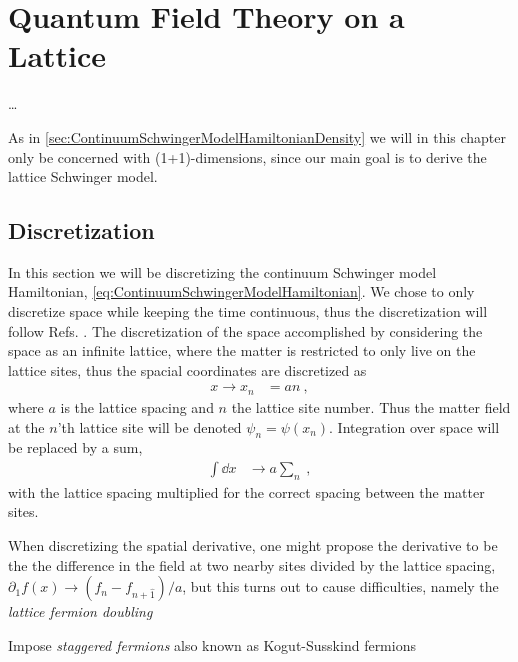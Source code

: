 \documentclass[../main.tex]{subfiles} %
\begin{document}
\chapter{Quantum Field Theory on a Lattice} \label{chap:LatticeQFT}

\ldots
\lipsum[1-4]

As in \cref{sec:ContinuumSchwingerModelHamiltonianDensity} we will in this chapter only be concerned with (1+1)-dimensions, since our main goal is to derive the lattice Schwinger model.




\section{Discretization}

In this section we will be discretizing the continuum Schwinger model Hamiltonian, \cref{eq:ContinuumSchwingerModelHamiltonian}. We chose to only discretize space while keeping the time continuous, thus the discretization will follow Refs. \cite{sriganish_PhD_LatticeSchwingerModel_2001, smit_introToQuantumFieldsOnALattice_2003}. The discretization of the space accomplished by considering the space as an infinite lattice, where the matter is restricted to only live on the lattice sites, thus the spacial coordinates are discretized as
\begin{align}
    x \rightarrow x_n &= an \: ,
\end{align}
where $a$ is the lattice spacing and $n$ the lattice site number. Thus the matter field at the $n$'th lattice site will be denoted $\psi_n = \psi(x_n)$. Integration over space will be replaced by a sum,
\begin{align}
    \int \dd{x} &\rightarrow a \sum_n \: ,
\end{align}
with the lattice spacing multiplied for the correct spacing between the matter sites.

When discretizing the spatial derivative, one might propose the derivative to be the the difference in the field at two nearby sites divided by the lattice spacing, $\partial_1 f(x) \rightarrow (f_n - f_{n + \hat{1}}) / a$, but this turns out to cause difficulties, namely the \emph{lattice fermion doubling}
\cite{GoswamiBandyopadhyay_FermionDoubling_1997}


Impose \emph{staggered fermions} also known as Kogut-Susskind fermions \cite{susskind_latticeFermions_1977, banksSusskindKogut_StrongCoupling_1976}
\end{document}
